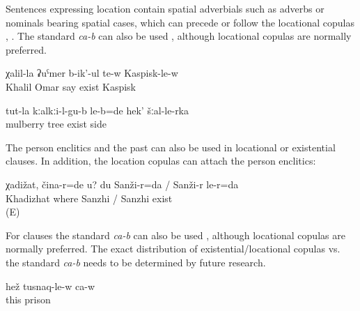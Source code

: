 Sentences expressing location contain spatial adverbials such as adverbs or nominals bearing spatial cases, which can precede or follow the locational copulas , . The standard  \textit{ca-b} can also be used , although locational copulas are normally preferred.

\begin{exe}
	\ex	\label{ex:Omar's Khalil is in Kaspisk}
	\gll	χalil-la	ʡuˁmer	b-ik'-ul	te-w	Kaspisk-le-w\\
		Khalil	Omar	say	exist	Kaspisk\\
	\glt	{}

	\ex	\label{ex:‎They were under the mulberry tree, from that side}
	\gll	tut-la	kːalkːi-l-gu-b	le-b=de	hek'	šːal-le-rka\\
		mulberry	tree	exist		side\\
	\glt	{}

\end{exe}

The person enclitics  and the past   can also be used in locational or existential clauses. In addition, the location copulas can attach the person enclitics:

\begin{exe}
	\ex	\label{ex:‎Khadizhat, where are you? I am in Sanzhi}
	\gll	χadižat,	čina-r=de	u?	du	Sanži-r=da	/	Sanži-r	le-r=da\\
		Khadizhat	where			Sanzhi	/ Sanzhi exist\\
	\glt	{} (E)
\end{exe}

For  clauses the standard  \textit{ca-b} can also be used , although locational copulas are normally preferred. The exact distribution of existential/locational copulas vs. the standard  \textit{ca-b} needs to be determined by future research. 

 \begin{exe}
	\ex	\label{ex:‎He is in prison}
	\gll	hež	tusnaq-le-w	ca-w\\
		this	prison	\\
	\glt	{}
\end{exe}

